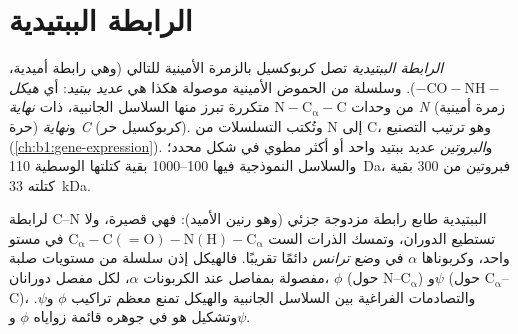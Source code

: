 \section{الرابطة الببتيدية}

\begin{definition}\label{def:b1:proteins:peptide}
\emph{الرابطة الببتيدية} تصل كربوكسيل 
بالزمرة الأمينية للتالي  (وهي رابطة أميدية،
$\mathrm{-CO{-}NH-}$). وسلسلة من الحموض الأمينية موصولة هكذا هي
\emph{عديد ببتيد}: أي \emph{هيكل} من وحدات
$\mathrm{N{-}C_\alpha{-}C}$ متكررة تبرز منها السلاسل الجانبية،
ذات \emph{نهاية N} (زمرة أمينية حرة) و\emph{نهاية C} (كربوكسيل حر).
وتُكتب التسلسلات من N إلى C، وهو ترتيب التصنيع
(\cref{ch:b1:gene-expression}). و\emph{البروتين} عديد
ببتيد واحد أو أكثر مطوي في شكل محدد؛ والسلاسل النموذجية فيها
\qtyrange{100}{1000}{} بقية كتلتها الوسطية \qty{110}{Da}، فبروتين من
\qty{300}{} بقية كتلته \qty{33}{kDa}.
\end{definition}

\begin{proposition}\label{prop:b1:proteins:geometry}
لرابطة C--N الببتيدية طابع رابطة مزدوجة جزئي (وهو رنين الأميد): فهي
قصيرة، ولا تستطيع الدوران، وتمسك الذرات الست
$\mathrm{C_\alpha{-}C(=O){-}N(H){-}C_\alpha}$ في مستو واحد، وكربوناها
$\alpha$ في وضع \emph{ترانس} دائمًا تقريبًا. فالهيكل إذن سلسلة من
مستويات صلبة مفصولة بمفاصل عند الكربونات $\alpha$، لكل مفصل دورانان،
$\phi$ (حول N--$\mathrm{C_\alpha}$) و$\psi$ (حول
$\mathrm{C_\alpha}$--C)، والتصادمات الفراغية بين السلاسل الجانبية
والهيكل تمنع معظم تراكيب $\phi$ و$\psi$. وتشكيل  هو في جوهره
قائمة زواياه $\phi$ و$\psi$.
\end{proposition}

